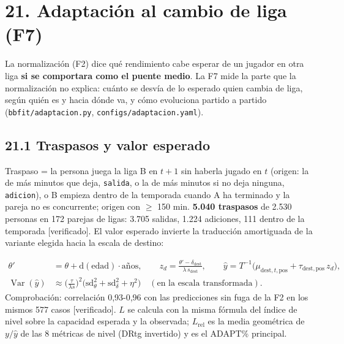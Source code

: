 \documentclass[10pt,a4paper]{article}
\begin{document}
\section*{21. Adaptación al cambio de liga (F7)}
La normalización (F2) dice qué rendimiento cabe esperar de un jugador en otra liga \textbf{si se comportara como el puente medio}. La F7 mide la parte que la normalización no explica: cuánto se desvía de lo esperado quien cambia de liga, según quién es y hacia dónde va, y cómo evoluciona partido a partido (\texttt{bbfit/\allowbreak{}adaptacion.py}, \texttt{configs/\allowbreak{}adaptacion.yaml}).

\subsection*{21.1 Traspasos y valor esperado}
Traspaso = la persona juega la liga B en $t+1$ sin haberla jugado en $t$ (origen: la de más minutos que deja, \texttt{salida}, o la de más minutos si no deja ninguna, \texttt{adicion}), o B empieza dentro de la temporada cuando A ha terminado y la pareja no es concurrente; origen con \ensuremath{\geq} 150 min. \textbf{5.040 traspasos} de 2.530 personas en 172 parejas de ligas: 3.705 salidas, 1.224 adiciones, 111 dentro de la temporada [verificado]. El valor esperado invierte la traducción amortiguada de la variante elegida hacia la escala de destino:

\[
\begin{aligned} \theta' &= \theta + \mathrm{d}(\text{edad})\cdot\text{años}, \qquad z_d = \frac{\theta' - \delta_{\mathrm{dest}}}{\lambda\,s_{\mathrm{dest}}}, \qquad \hat y = T^{-1}\!\big(\mu_{\mathrm{dest},t,\mathrm{pos}} + \tau_{\mathrm{dest},\mathrm{pos}}\, z_d\big),\\ \operatorname{Var}(\hat y) &\approx \Big(\frac{\tau}{\lambda s}\Big)^2\big(\mathrm{sd}_\theta^2 + \mathrm{sd}_\delta^2 + \eta^2\big) \quad (\text{en la escala transformada}) . \end{aligned}
\]
Comprobación: correlación 0,93-0,96 con las predicciones sin fuga de la F2 en los mismos 577 casos [verificado]. $L$ se calcula con la misma fórmula del índice de nivel sobre la capacidad esperada y la observada; $L_{\mathrm{rel}}$ es la media geométrica de $y/\hat y$ de las 8 métricas de nivel (DRtg invertido) y es el ADAPT\% principal.
\end{document}
